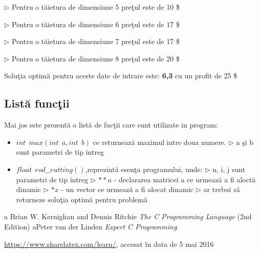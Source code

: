 \documentclass{article}
\begin{document}
\begin{itemize}
\par $\triangleright $ Pentru o t\u{a}ietura de dimensiune 5 pre\c{t}ul este de 10 \$
\newline
\par $\triangleright $ Pentru o t\u{a}ietura de dimensiune 6 pre\c{t}ul este de 17 \$
\newline
\par $\triangleright $ Pentru o t\u{a}ietura de dimensiune 7 pre\c{t}ul este de 17 \$
\newline
\par $\triangleright $ Pentru o t\u{a}ietura de dimensiune 8 pre\c{t}ul este de 20 \$
\newline
\par \qquad Solu\c{t}ia optim\u{a} pentru aceste date de intrare este: \textbf{6,3} cu un profit de 25 \$
\end{itemize}
\newpage
\subsection{List\u{a} func\c{t}ii}
\par \qquad Mai jos este prezent\u{a} o list\u{a} de fuc\c{t}ii care sunt utilizate in program:

\begin{itemize}
 \item  $ int \> \> max(int \> \> a, int \> \> b) $ ce returneaz\u{a} maximul intre doua numere.
 \newline
 \qquad \qquad  $\triangleright $ a \c{s}i b sunt parametri de tip intreg
 \newline
 
\item $ float \> \> rod\_\_cutting() $,reprezint\u{a} esen\c{t}a programului, unde:
\newline
\qquad \qquad $\triangleright $ n, i, j sunt parametri de tip intreg
\newline
\qquad \qquad $\triangleright $ $ **a $ - declararea matricei a ce urmeaz\u{a} a fi aloct\u{a} dinamic
\newline
\qquad \qquad $\triangleright $ $ *x $ - un vector ce urmeaz\u{a} a fi alocat dinamic
\newline 
\qquad \qquad $\triangleright $ ar trebui s\u{a} returneze solu\c{t}ia optim\u{a} pentru problem\u{a}
\end{itemize}



\begin{thebibliography}{9}
\bibitem a Brian W. Kernighan and Dennis Ritchie
        \emph{The C Programming Language} (2nd Edition)
\bibitem  aPeter van der Linden 
        \emph{Expert C Programming}
      
     \url{https://www.sharelatex.com/learn/},
     accesat \^in data de 5 mai 2016 
\end{thebibliography}
\end{document}
